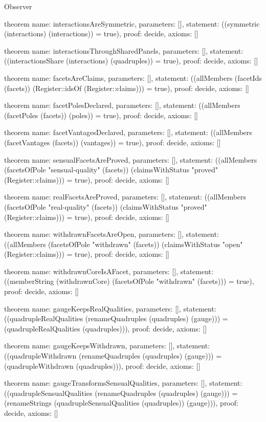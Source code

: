\begin{lexlean}{Observer}
\begin{semanticmodule}
theorem{
  name: interactionsAreSymmetric,
  parameters: [],
  statement: ((symmetric (interactions) (interactions)) = true),
  proof: decide{},
  axioms: []
}

theorem{
  name: interactionsThroughSharedPanels,
  parameters: [],
  statement: ((interactionsShare (interactions) (quadruples)) = true),
  proof: decide{},
  axioms: []
}

theorem{
  name: facetsAreClaims,
  parameters: [],
  statement: ((allMembers (facetIds (facets)) (Register::idsOf (Register::claims))) = true),
  proof: decide{},
  axioms: []
}

theorem{
  name: facetPolesDeclared,
  parameters: [],
  statement: ((allMembers (facetPoles (facets)) (poles)) = true),
  proof: decide{},
  axioms: []
}

theorem{
  name: facetVantagesDeclared,
  parameters: [],
  statement: ((allMembers (facetVantages (facets)) (vantages)) = true),
  proof: decide{},
  axioms: []
}

theorem{
  name: sensualFacetsAreProved,
  parameters: [],
  statement: ((allMembers (facetsOfPole "sensual-quality" (facets)) (claimsWithStatus "proved" (Register::claims))) = true),
  proof: decide{},
  axioms: []
}

theorem{
  name: realFacetsAreProved,
  parameters: [],
  statement: ((allMembers (facetsOfPole "real-quality" (facets)) (claimsWithStatus "proved" (Register::claims))) = true),
  proof: decide{},
  axioms: []
}

theorem{
  name: withdrawnFacetsAreOpen,
  parameters: [],
  statement: ((allMembers (facetsOfPole "withdrawn" (facets)) (claimsWithStatus "open" (Register::claims))) = true),
  proof: decide{},
  axioms: []
}

theorem{
  name: withdrawnCoreIsAFacet,
  parameters: [],
  statement: ((memberString (withdrawnCore) (facetsOfPole "withdrawn" (facets))) = true),
  proof: decide{},
  axioms: []
}

theorem{
  name: gaugeKeepsRealQualities,
  parameters: [],
  statement: ((quadrupleRealQualities (renameQuadruples (quadruples) (gauge))) = (quadrupleRealQualities (quadruples))),
  proof: decide{},
  axioms: []
}

theorem{
  name: gaugeKeepsWithdrawn,
  parameters: [],
  statement: ((quadrupleWithdrawn (renameQuadruples (quadruples) (gauge))) = (quadrupleWithdrawn (quadruples))),
  proof: decide{},
  axioms: []
}

theorem{
  name: gaugeTransformsSensualQualities,
  parameters: [],
  statement: ((quadrupleSensualQualities (renameQuadruples (quadruples) (gauge))) = (renameStrings (quadrupleSensualQualities (quadruples)) (gauge))),
  proof: decide{},
  axioms: []
}
\end{semanticmodule}
\end{lexlean}
